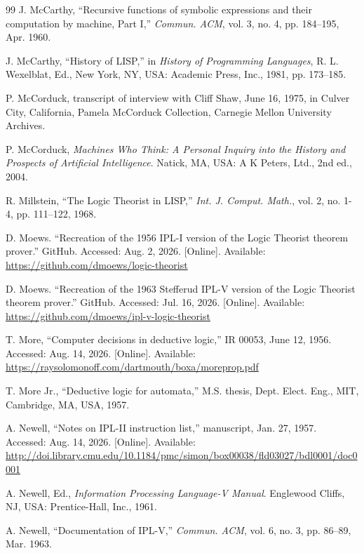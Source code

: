 \documentclass[journal]{IEEEtran}
\begin{document}
\begin{thebibliography}{99}
 J. McCarthy, ``Recursive functions of
  symbolic expressions and their computation by machine, Part I,''
  \textit{Commun. ACM}, vol. 3, no. 4, pp. 184--195, Apr. 1960.

 J. McCarthy, ``History of LISP,'' in
  \textit{History of Programming Languages}, R. L. Wexelblat, Ed.,
  New York, NY, USA: Academic Press, Inc., 1981, pp. 173--185.

 P. McCorduck, transcript of interview
  with Cliff Shaw, June 16, 1975, in Culver City, California,
  Pamela McCorduck Collection, Carnegie Mellon University Archives.

 P. McCorduck, \textit{Machines Who
  Think: A Personal Inquiry into the History and Prospects
  of Artificial Intelligence}. Natick, MA, USA: A K Peters, Ltd., 2nd ed., 2004.

 R. Millstein, ``The Logic Theorist in
  LISP,'' \textit{Int. J. Comput. Math.},
  vol. 2, no. 1-4, pp. 111--122, 1968.

 D. Moews.
  ``Recreation of the 1956 IPL-I version of the Logic Theorist theorem
  prover.''
  GitHub.
  Accessed: Aug. 2, 2026.  [Online].
  Available: \url{https://github.com/dmoews/logic-theorist}

 D. Moews.
  ``Recreation of the 1963 Stefferud IPL-V version of the Logic Theorist
  theorem prover.''
  GitHub.
  Accessed: Jul. 16, 2026.  [Online].
  Available: \url{https://github.com/dmoews/ipl-v-logic-theorist}

 T. More,
  ``Computer decisions in deductive logic,'' IR 00053, June 12, 1956.
  Accessed: Aug. 14, 2026.  [Online].
  Available: \url{https://raysolomonoff.com/dartmouth/boxa/moreprop.pdf}

 T. More Jr., ``Deductive logic for automata,''
  M.S. thesis,
  Dept. Elect. Eng., MIT, Cambridge, MA, USA, 1957.

 A. Newell, ``Notes on IPL-II instruction list,''
  manuscript, Jan. 27, 1957.
  Accessed: Aug. 14, 2026.  [Online].
  Available: \url{http://doi.library.cmu.edu/10.1184/pmc/simon/box00038/fld03027/bdl0001/doc0001}

 A. Newell, Ed., \textit{Information
  Processing Language-V Manual}. Englewood Cliffs, NJ, USA:
  Prentice-Hall, Inc., 1961.

 A. Newell, ``Documentation of IPL-V,''
  \textit{Commun. ACM}, vol. 6, no. 3, pp. 86--89, Mar. 1963.


\end{thebibliography}
\end{document}
